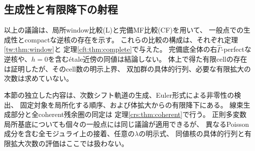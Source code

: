 \subsection{生成性と有限降下の射程}

以上の議論は、局所window比較(L)と完備MF比較(CF)を用いて、
一般点での生成性とcompactな逆核の存在を示す。
これらの比較の構成は、それぞれ定理\ref{tw:thm:window}と
定理\ref{cft:thm:complete}で与えた。
完備底全体の右$\widehat\Gamma$-perfectな逆核や、$h=0$を含むétale近傍の同値は結論しない。
体上で得た有限cellの存在は証明したが、そのcell数の明示上界、
双加群の具体的行列、必要な有限拡大の次数は求めていない。

本節の独立した内容は、次数シフト軌道の生成、Euler形式による非零性の検出、
固定対象を局所化する順序、および体拡大からの有限降下にある。
線束生成部分と全coherent残余圏の同定は
定理\ref{crs:thm:coherent}で行う。
正則多変数局所基底についても個々の一般点には同じ議論が適用できるが、
異なるPoisson成分を含む全モジュライ上の接着、任意の$\lambda$の明示式、
同値核の具体的行列と有限拡大次数の評価はここでは扱わない。
